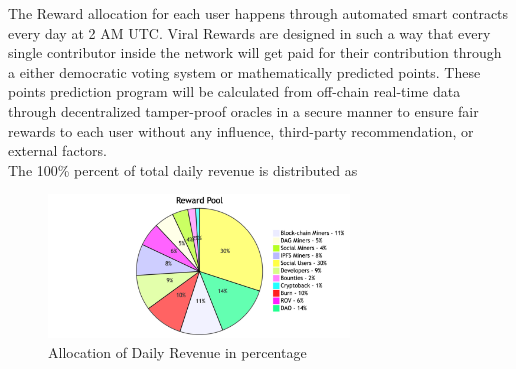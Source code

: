 \documentclass[conference]{IEEEtran}
\begin{document}
The Reward allocation for each user happens through automated smart contracts every day at 2 AM UTC. Viral Rewards are designed in such a way that every single contributor inside the network will get paid for their contribution through a either democratic voting system or mathematically predicted points. These points prediction program will be calculated from off-chain real-time data through decentralized tamper-proof oracles in a secure  manner to ensure fair rewards to each user without any influence, third-party recommendation, or external factors. \\

The 100\% percent of total daily revenue is distributed as \\
\begin{figure}[H]
\begin{center}
\includegraphics[width=8cm]{global-reward}
\caption{Allocation of Daily Revenue in percentage}
\end{center}
\end{figure}
\end{document}

